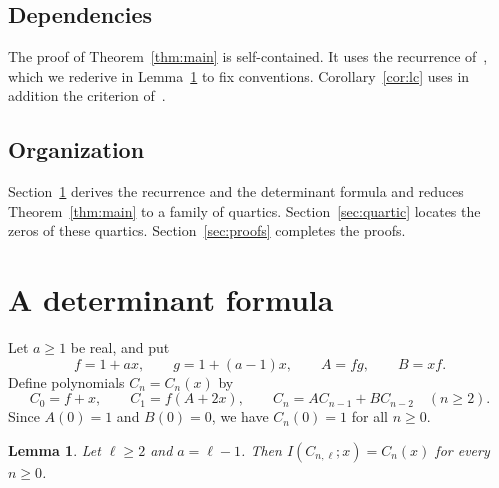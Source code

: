 \documentclass{amsart}
\newtheorem{lemma}[theorem]{Lemma}
\theoremstyle{remark}
\numberwithin{equation}{section}
\begin{document}
\subsection*{Dependencies}
The proof of Theorem~\ref{thm:main} is self-contained. It uses the
recurrence of~\cite[Theorem~1.7]{GS}, which we rederive in
Lemma~\ref{lem:rec} to fix conventions. Corollary~\ref{cor:lc} uses in
addition the criterion of~\cite{BRW}.

\subsection*{Organization}
Section~\ref{sec:det} derives the recurrence and the determinant formula and
reduces Theorem~\ref{thm:main} to a family of quartics. Section~\ref{sec:quartic}
locates the zeros of these quartics. Section~\ref{sec:proofs} completes the
proofs.

\section{A determinant formula}\label{sec:det}

Let $a\ge 1$ be real, and put
\begin{equation}\label{eq:fg}
f=1+ax,\qquad g=1+(a-1)x,\qquad A=fg,\qquad B=xf.
\end{equation}
Define polynomials $C_n=C_n(x)$ by
\begin{equation}\label{eq:rec}
C_0=f+x,\qquad C_1=f(A+2x),\qquad C_n=AC_{n-1}+BC_{n-2}\quad(n\ge 2).
\end{equation}
Since $A(0)=1$ and $B(0)=0$, we have $C_n(0)=1$ for all $n\ge 0$.

\begin{lemma}\label{lem:rec}
Let $\ell\ge 2$ and $a=\ell-1$. Then $I(C_{n,\ell};x)=C_n(x)$ for every
$n\ge 0$.
\end{lemma}
\end{document}
